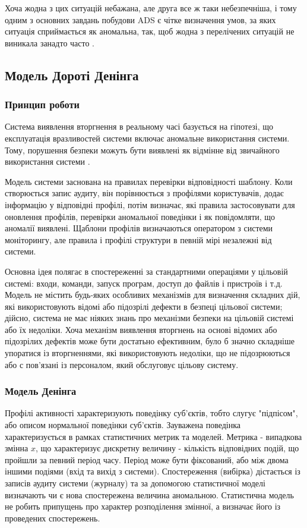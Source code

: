 Хоча жодна з цих ситуацій небажана, але друга все ж таки небезпечніша, і тому одним з основних завдань побудови ADS є чітке визначення умов, за яких ситуація сприймається як аномальна, так, щоб жодна з перелічених ситуацій не виникала занадто часто \cite{axelsson1999base}.

\subsection{Модель Дороті Денінга}
\subsubsection{Принцип роботи}
Система виявлення вторгнення в реальному часі базується на гіпотезі, що 
експлуатація вразливостей системи включає аномальне використання системи.
Тому, порушення безпеки можуть бути виявлені як відмінне від звичайного використання системи
\cite{denning1987intrusion}.

Модель системи заснована на правилах перевірки відповідності шаблону. Коли
створюється запис аудиту, він порівнюється з профілями користувачів, додає
інформацію у відповідні профілі, потім визначає, які правила застосовувати для
оновлення профілів, перевірки аномальної поведінки і як повідомляти, що аномалії
виявлені. Щаблони профілів визначаються оператором з системи моніторингу, але
правила і профілі структури в певній мірі незалежні від системи.

Основна ідея полягає в спостереженні за стандартними операціями у цільовій
системі: входи, команди, запуск програм, доступ до файлів і пристроїв і т.д. 
Модель не містить будь-яких особливих механізмів для визначення складних дій, 
які використовують відомі або підозрілі дефекти в безпеці цільової системи; 
дійсно, система не має ніяких знань про механізми безпеки на цільовій системі 
або їх недоліки. Хоча механізм виявлення вторгнень на основі відомих або 
підозрілих дефектів може бути достатьно ефективним, було б значно складніше 
упоратися із вторгненнями, які використовують недоліки, що не підозрюються або с 
пов'язані із персоналом, який обслуговує цільову систему.

\subsubsection{Модель Денінга}

Профілі активності характеризують поведінку суб'єктів, тобто слугує "підпісом", 
або описом нормальної поведінки суб'єктів. Зауважена поведінка характеризується 
в рамках статистичних метрик та моделей. Метрика - випадкова змінна $x$, що 
характеризує дискретну величину - кількість відповідних подій, що пройшли за 
певний період часу. Період може бути фіксований, або між двома іншими подіями
(вхід та вихід з системи). Спостереження (вибірка) дістається із записів аудиту 
системи (журналу) та за допомогою статистичної моделі визначають чи є нова 
спостережена величина аномальною. Статистична модель не робить припущень про
характер розподілення змінної, а визначає його із проведених спостережень.

